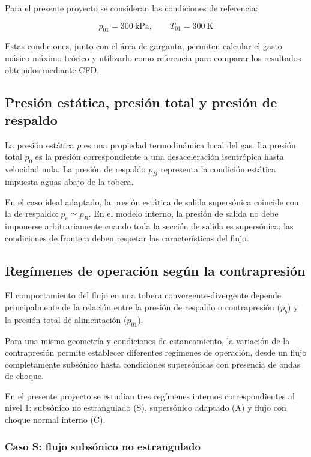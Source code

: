 \documentclass[12pt,letterpaper]{article}
\numberwithin{equation}{section}
\begin{document}
Para el presente proyecto se consideran
las condiciones de referencia:

\begin{equation}
    p_{01}=300\ \mathrm{kPa},
    \qquad
    T_{01}=300\ \mathrm{K}
\end{equation}

Estas condiciones, junto con el área
de garganta, permiten calcular el
gasto másico máximo teórico y utilizarlo
como referencia para comparar los
resultados obtenidos mediante CFD.

\subsection{Presión estática, presión total y presión de respaldo}
La presión estática $p$ es una propiedad termodinámica local del gas. La presión total $p_0$ es la presión correspondiente a una desaceleración isentrópica hasta velocidad nula. La presión de respaldo $p_B$ representa la condición estática impuesta aguas abajo de la tobera.

En el caso ideal adaptado, la presión estática de salida supersónica coincide con la de respaldo: $p_e\simeq p_B$. En el modelo interno, la presión de salida no debe imponerse arbitrariamente cuando toda la sección de salida es supersónica; las condiciones de frontera deben respetar las características del flujo.


\subsection{Regímenes de operación según la contrapresión}

El comportamiento del flujo en una tobera
convergente-divergente depende principalmente de
la relación entre la presión de respaldo o
contrapresión ($p_b$) y la presión total de
alimentación ($p_{01}$).

Para una misma geometría y condiciones de
estancamiento, la variación de la contrapresión
permite establecer diferentes regímenes de
operación, desde un flujo completamente subsónico
hasta condiciones supersónicas con presencia
de ondas de choque.

En el presente proyecto se estudian tres
regímenes internos correspondientes al nivel 1:
subsónico no estrangulado (S), supersónico
adaptado (A) y flujo con choque normal interno
(C).

\subsubsection{Caso S: flujo subsónico no estrangulado}
\end{document}
